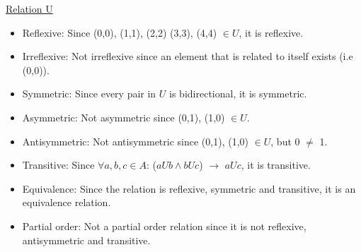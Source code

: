 \underline{Relation U}
\begin{itemize}
    \item Reflexive: Since (0,0), (1,1), (2,2) (3,3), (4,4) $\in U$, it is reflexive.
    \item Irreflexive: Not irreflexive since an element that is related to itself exists (i.e (0,0)).
    \item Symmetric: Since every pair in $U$ is bidirectional, it is symmetric.
    \item Asymmetric: Not asymmetric since (0,1), (1,0) $\in U$.
    \item Antisymmetric: Not antisymmetric since (0,1), (1,0) $\in U$, but 0 $\neq$ 1.
    \item Transitive: Since $\forall a,b,c \in A$: ($aUb \wedge bUc$) $\rightarrow$ $aUc$, it is transitive.
    \item Equivalence: Since the relation is reflexive, symmetric and transitive, it is an equivalence relation.
    \item Partial order: Not a partial order relation since it is not reflexive, antisymmetric and transitive.
\end{itemize}